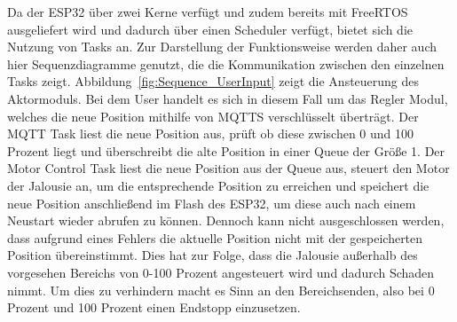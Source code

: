 Da der ESP32 über zwei Kerne verfügt und zudem bereits mit FreeRTOS ausgeliefert wird und dadurch über einen Scheduler verfügt, bietet sich die Nutzung von Tasks an. Zur Darstellung der Funktionsweise werden daher auch hier Sequenzdiagramme genutzt, die die Kommunikation zwischen den einzelnen Tasks zeigt. Abbildung~\ref{fig:Sequence_UserInput} zeigt die Ansteuerung des Aktormoduls. Bei dem User handelt es sich in diesem Fall um das Regler Modul, welches die neue Position mithilfe von MQTTS verschlüsselt überträgt. Der MQTT Task liest die neue Position aus, prüft ob diese zwischen 0 und 100 Prozent liegt und überschreibt die alte Position in einer Queue der Größe 1. Der Motor Control Task liest die neue Position aus der Queue aus, steuert den Motor der Jalousie an, um die entsprechende Position zu erreichen und speichert die neue Position anschließend im Flash des ESP32, um diese auch nach einem Neustart wieder abrufen zu können. Dennoch kann nicht ausgeschlossen werden, dass aufgrund eines Fehlers die aktuelle Position nicht mit der gespeicherten Position übereinstimmt. Dies hat zur Folge, dass die Jalousie außerhalb des vorgesehen Bereichs von 0-100 Prozent angesteuert wird und dadurch Schaden nimmt. Um dies zu verhindern macht es Sinn an den Bereichsenden, also bei 0 Prozent und 100 Prozent einen Endstopp einzusetzen.
